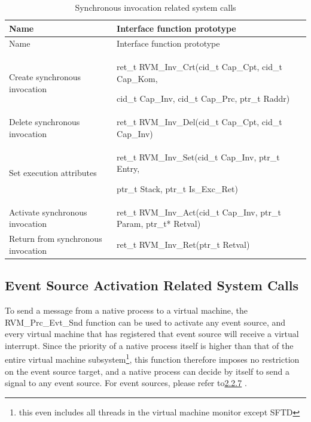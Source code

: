 \begin{xltabular}{\textwidth}{@{}>{\hsize\raggedright\arraybackslash}X>{\hsize\raggedright\arraybackslash}X@{}}
\caption{Synchronous invocation related system calls}\label{tab:3-11}\\
\toprule
Name & Interface function prototype\tabularnewline
\endfirsthead
\toprule
Name & Interface function prototype\tabularnewline
\midrule
\endhead
\bottomrule
\endlastfoot
Create synchronous invocation\strut
 & ret\_\allowbreak{}t RVM\_\allowbreak{}Inv\_\allowbreak{}Crt(cid\_\allowbreak{}t Cap\_\allowbreak{}Cpt, cid\_\allowbreak{}t Cap\_\allowbreak{}Kom,

cid\_\allowbreak{}t Cap\_\allowbreak{}Inv, cid\_\allowbreak{}t Cap\_\allowbreak{}Prc, ptr\_\allowbreak{}t Raddr)\strut
\tabularnewline
Delete synchronous invocation & ret\_\allowbreak{}t RVM\_\allowbreak{}Inv\_\allowbreak{}Del(cid\_\allowbreak{}t Cap\_\allowbreak{}Cpt, cid\_\allowbreak{}t
Cap\_\allowbreak{}Inv)\tabularnewline
Set execution attributes\strut
 & ret\_\allowbreak{}t RVM\_\allowbreak{}Inv\_\allowbreak{}Set(cid\_\allowbreak{}t Cap\_\allowbreak{}Inv, ptr\_\allowbreak{}t Entry,

ptr\_\allowbreak{}t Stack, ptr\_\allowbreak{}t Is\_\allowbreak{}Exc\_\allowbreak{}Ret)\strut
\tabularnewline
Activate synchronous invocation & ret\_\allowbreak{}t RVM\_\allowbreak{}Inv\_\allowbreak{}Act(cid\_\allowbreak{}t Cap\_\allowbreak{}Inv, ptr\_\allowbreak{}t Param,
ptr\_\allowbreak{}t* Retval)\tabularnewline
Return from synchronous invocation & ret\_\allowbreak{}t RVM\_\allowbreak{}Inv\_\allowbreak{}Ret(ptr\_\allowbreak{}t Retval)\tabularnewline
\end{xltabular}

\subsection{Event Source Activation Related System Calls}\label{subsec:3-5-8}

To send a message from a native process to a virtual machine, the RVM\_Prc\_Evt\_Snd function can be used to activate any event source, and every virtual machine that has registered that event source will receive a virtual interrupt. Since the priority of a native process itself is higher than that of the entire virtual machine subsystem\footnote{this even includes all threads in the virtual machine monitor except SFTD}, this function therefore imposes no restriction on the event source target, and a native process can decide by itself to send a signal to any event source. For event sources, please refer to\protect\hyperref[subsec:2-2-7]{2.2.7}
.

